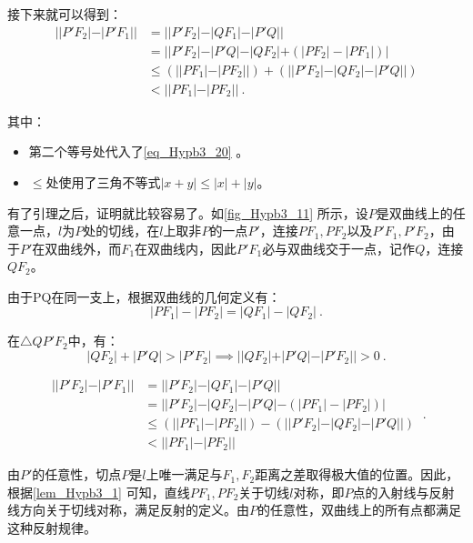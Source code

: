 接下来就可以得到：
\begin{equation}
\begin{split}
||P'F_2| - |P'F_1||
&= ||P'F_2| - |QF_1| - |P'Q|| \\
&= ||P'F_2|- |P'Q|  - |QF_2| + ( |PF_2|-|PF_1|)| \\
&\leq (||PF_1| - |PF_2||) + (||P'F_2| - |QF_2| - |P'Q||)\\
&< ||PF_1| - |PF_2||~.
\end{split}
\end{equation}

其中：
\begin{itemize}
\item 第二个等号处代入了\autoref{eq_Hypb3_20} 。
\item $\leq$处使用了三角不等式$|x+y|\leq|x|+|y|$。
\end{itemize}



有了引理之后，证明就比较容易了。如\autoref{fig_Hypb3_11} 所示，设$P$是双曲线上的任意一点，$l$为$P$处的切线，在$l$上取非$P$的一点$P'$，连接$PF_1,PF_2$以及$P'F_1,P'F_2$，由于$P'$在双曲线外，而$F_1$在双曲线内，因此$P'F_1$必与双曲线交于一点，记作$Q$，连接$QF_2$。


由于PQ在同一支上，根据双曲线的几何定义有：
\begin{equation}
|PF_1| - |PF_2|=|QF_1| - |QF_2|~.
\end{equation}

在$\triangle QP'F_2$中，有：
\begin{equation}
|QF_2|+|P'Q|>|P'F_2|\implies||QF_2|+|P'Q|-|P'F_2||>0~.
\end{equation}

\begin{equation}
\begin{split}
||P'F_2|-|P'F_1|| &=||P'F_2|-|QF_1|-|P'Q||\\
&=||P'F_2|-|QF_2|-|P'Q|-(|PF_1| - |PF_2|)|\\
&\leq(||PF_1| - |PF_2||)- (||P'F_2|-|QF_2|-|P'Q||)\\
&<||PF_1| - |PF_2||
\end{split}~.
\end{equation}

由$P'$的任意性，切点$P$是$l$上唯一满足与$F_1,F_2$距离之差取得极大值的位置。因此，根据\autoref{lem_Hypb3_1} 可知，直线$PF_1,PF_2$关于切线$l$对称，即$P$点的入射线与反射线方向关于切线对称，满足反射的定义。由$P$的任意性，双曲线上的所有点都满足这种反射规律。



